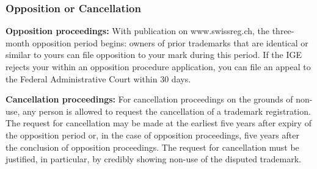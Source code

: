 \subsubsection{Opposition or Cancellation}
\begin{compactitem}
	\item \textbf{Opposition proceedings:} With publication on www.swissreg.ch, the three-month opposition period
	begins: owners of prior trademarks that are identical or similar to yours can file opposition to your mark during this period.	If the IGE rejects your within an opposition procedure application, you can file an appeal to the Federal Administrative Court within 30 days.
	\item \textbf{Cancellation proceedings:} For cancellation proceedings on the grounds of non-use, any person is
	allowed to request the cancellation of a trademark registration. The request for cancellation may be made at the earliest five years after expiry of the opposition period or, in the case of opposition proceedings, five years after the conclusion of opposition proceedings. The request for cancellation must be justified, in particular, by credibly
	showing non-use of the disputed trademark.
\end{compactitem}

